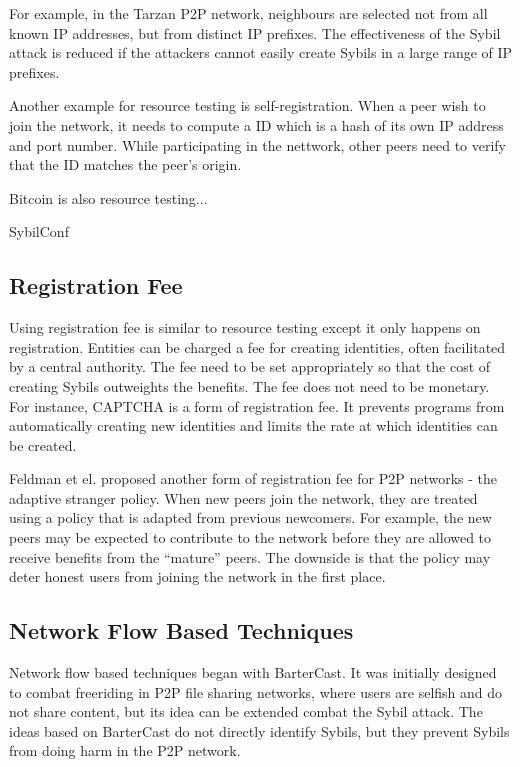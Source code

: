 For example, in the Tarzan P2P network, neighbours are selected not from all
known IP addresses, but from distinct IP prefixes\cite{freedman2002tarzan}. The
effectiveness of the Sybil attack is reduced if the attackers cannot easily
create Sybils in a large range of IP prefixes.

Another example for resource
testing is self-registration\cite{dinger2006defending}. When a peer wish to join
the network, it needs to compute a ID which is a hash of its own IP address and
port number. While participating in the nettwork, other peers need to verify
that the ID matches the peer's origin.

Bitcoin is also resource testing...

SybilConf\cite{tegeler2010sybilconf}

\subsection{Registration Fee}
Using registration fee is similar to resource testing except it only happens on
registration. Entities can be charged a fee for creating identities, often 
facilitated by a central authority. The fee need to be set appropriately so that
the cost of creating Sybils outweights the benefits. The fee does not need to be
monetary. For instance, CAPTCHA\cite{von2003captcha} is a form of
registration fee. It prevents programs from automatically creating new
identities and limits the rate at which identities can be created.

Feldman et el. proposed another form of registration fee for P2P networks - the
adaptive stranger policy\cite{feldman2004robust}. When new peers join the
network, they are treated using a policy that is adapted from previous
newcomers. For example, the new peers may be expected to contribute to the
network before they are allowed to receive benefits from the ``mature'' peers.
The downside is that the policy may deter honest users from joining the network
in the first place.


\subsection{Network Flow Based Techniques}\label{sec:network-flow}
Network flow based techniques began with
BarterCast\cite{meulpolder2009bartercast}. It was initially designed to combat
freeriding in P2P file sharing networks, where users are selfish and do not
share content, but its idea can be extended combat the Sybil attack. The ideas
based on BarterCast do not directly identify Sybils, but they prevent Sybils
from doing harm in the P2P network.

